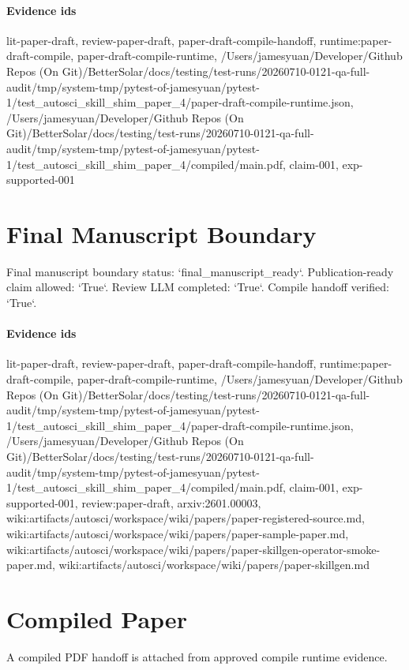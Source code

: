 \documentclass{article}
\begin{document}
\paragraph{Evidence ids} lit-paper-draft, review-paper-draft, paper-draft-compile-handoff, runtime:paper-draft-compile, paper-draft-compile-runtime, /Users/jamesyuan/Developer/Github Repos (On Git)/BetterSolar/docs/testing/test-runs/20260710-0121-qa-full-audit/tmp/system-tmp/pytest-of-jamesyuan/pytest-1/test\_autosci\_skill\_shim\_paper\_4/paper-draft-compile-runtime.json, /Users/jamesyuan/Developer/Github Repos (On Git)/BetterSolar/docs/testing/test-runs/20260710-0121-qa-full-audit/tmp/system-tmp/pytest-of-jamesyuan/pytest-1/test\_autosci\_skill\_shim\_paper\_4/compiled/main.pdf, claim-001, exp-supported-001

\section{Final Manuscript Boundary}
Final manuscript boundary status: `final\_manuscript\_ready`. Publication-ready claim allowed: `True`. Review LLM completed: `True`. Compile handoff verified: `True`.

\paragraph{Evidence ids} lit-paper-draft, review-paper-draft, paper-draft-compile-handoff, runtime:paper-draft-compile, paper-draft-compile-runtime, /Users/jamesyuan/Developer/Github Repos (On Git)/BetterSolar/docs/testing/test-runs/20260710-0121-qa-full-audit/tmp/system-tmp/pytest-of-jamesyuan/pytest-1/test\_autosci\_skill\_shim\_paper\_4/paper-draft-compile-runtime.json, /Users/jamesyuan/Developer/Github Repos (On Git)/BetterSolar/docs/testing/test-runs/20260710-0121-qa-full-audit/tmp/system-tmp/pytest-of-jamesyuan/pytest-1/test\_autosci\_skill\_shim\_paper\_4/compiled/main.pdf, claim-001, exp-supported-001, review:paper-draft, arxiv:2601.00003, wiki:artifacts/autosci/workspace/wiki/papers/paper-registered-source.md, wiki:artifacts/autosci/workspace/wiki/papers/paper-sample-paper.md, wiki:artifacts/autosci/workspace/wiki/papers/paper-skillgen-operator-smoke-paper.md, wiki:artifacts/autosci/workspace/wiki/papers/paper-skillgen.md

\section{Compiled Paper}
A compiled PDF handoff is attached from approved compile runtime evidence.
\end{document}
